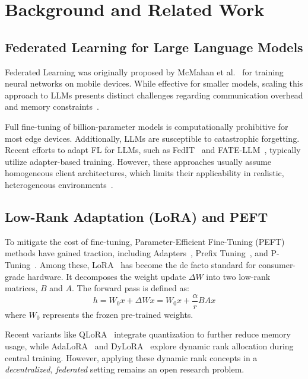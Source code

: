 \documentclass[conference]{IEEEtran}
\begin{document}
\section{Background and Related Work}
\label{sec:background}

\subsection{Federated Learning for Large Language Models}

Federated Learning was originally proposed by McMahan et al.~\cite{mcmahan2017fedavg} for training neural networks on mobile devices. While effective for smaller models, scaling this approach to LLMs presents distinct challenges regarding communication overhead and memory constraints~\cite{zhang2025surveyfedlora, zhuang2023foundation}.

Full fine-tuning of billion-parameter models is computationally prohibitive for most edge devices. Additionally, LLMs are susceptible to catastrophic forgetting. Recent efforts to adapt FL for LLMs, such as FedIT~\cite{zhang2023fedit} and FATE-LLM~\cite{fan2023fate}, typically utilize adapter-based training. However, these approaches usually assume homogeneous client architectures, which limits their applicability in realistic, heterogeneous environments~\cite{yao2024fedllm, chen2023fedllm}.

\subsection{Low-Rank Adaptation (LoRA) and PEFT}

To mitigate the cost of fine-tuning, Parameter-Efficient Fine-Tuning (PEFT) methods have gained traction, including Adapters~\cite{houlsby2019parameter}, Prefix Tuning~\cite{li2021prefix}, and P-Tuning~\cite{liu2022p}. Among these, LoRA~\cite{hu2021lora} has become the de facto standard for consumer-grade hardware. It decomposes the weight update $\Delta W$ into two low-rank matrices, $B$ and $A$. The forward pass is defined as:
\begin{equation}
h = W_0 x + \Delta W x = W_0 x + \frac{\alpha}{r} BA x
\end{equation}
where $W_0$ represents the frozen pre-trained weights.

Recent variants like QLoRA~\cite{dettmers2024qlora} integrate quantization to further reduce memory usage, while AdaLoRA~\cite{zhang2023adalora} and DyLoRA~\cite{valipour2023dylora} explore dynamic rank allocation during central training. However, applying these dynamic rank concepts in a \textit{decentralized, federated} setting remains an open research problem.
\end{document}
